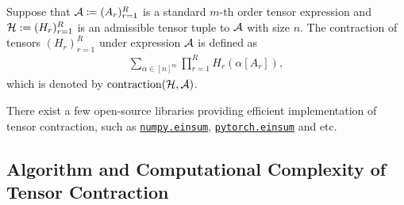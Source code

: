 \documentclass[letterpaper,11pt]{article}
\renewcommand{\todo}[2][]{%
    \textcolor{red}{%
        \textbf{ \#TODO%
        \if\relax\detokenize{#1}\relax%
        \else%
            \ (#1)%
        \fi%
        : #2}%
    }%
}
\newcommand{\tensorcontraction}{\mathrm{contraction}}
\begin{document}
\begin{bibunit}[plainnat]
\begin{definition}\label{def:tensor_contraction}
    Suppose that ${\mathcal{A}} \coloneqq (A_r)_{r=1}^R$ is a standard $m$-th order tensor expression and ${\mathcal{H}} := (H_r)_{r=1}^R$ is an admissible tensor tuple to ${\mathcal{A}}$ with size $n$. The contraction of tensors $(H_r)_{r=1}^R$ under expression ${\mathcal{A}}$ is defined as
    \begin{align*}
        \sum_{\alpha \in [n]^m} \prod_{r=1}^R H_r(\alpha[A_r]),  
    \end{align*}
    which is denoted by $\tensorcontraction(\calH, \calA)$.
\end{definition}

\begin{remark}
\label{rem:libraries}
There exist a few open-source libraries providing efficient implementation of tensor contraction, such as \href{https://numpy.org/doc/2.1/reference/generated/numpy.einsum.html}{\texttt{numpy.einsum}}, \href{https://pytorch.org/docs/stable/generated/torch.einsum.html}{\texttt{pytorch.einsum}} and etc. 
\end{remark}

\subsection{Algorithm and Computational Complexity of Tensor Contraction}




\putbib[\myreferences]
\end{bibunit}
\appendix
\end{document}
